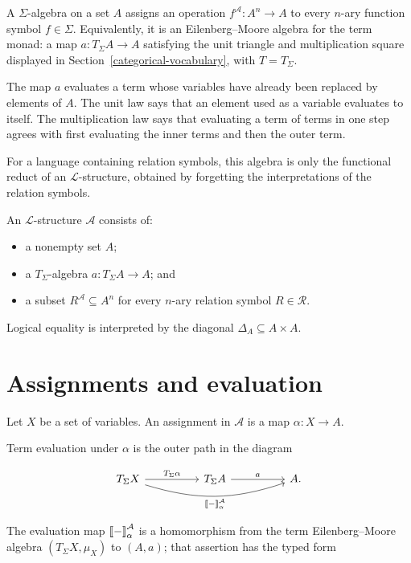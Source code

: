 \documentclass[11pt]{article}
\newcommand{\llbracket}{\mathopen{[\mkern-3mu[}}
\newcommand{\rrbracket}{\mathclose{]\mkern-3mu]}}
\newcommand{\tightlist}{\setlength{\itemsep}{0pt}%
  \setlength{\parskip}{0pt}}
\begin{document}
A \(\Sigma\)-algebra on a set \(A\) assigns an operation
\(f^{\mathcal A}:A^n\to A\) to every \(n\)-ary function symbol
\(f\in\Sigma\). Equivalently, it is an Eilenberg--Moore algebra for the
term monad: a map \(a:T_\Sigma A\to A\) satisfying the unit triangle and
multiplication square displayed in Section~\ref{categorical-vocabulary}, with
\(T=T_\Sigma\).

The map \(a\) evaluates a term whose variables have already been
replaced by elements of \(A\). The unit law says that an element used as
a variable evaluates to itself. The multiplication law says that
evaluating a term of terms in one step agrees with first evaluating the
inner terms and then the outer term.

For a language containing relation symbols, this algebra is only the
functional reduct of an \(\mathcal L\)-structure, obtained by forgetting
the interpretations of the relation symbols.

An
\(\mathcal L\)-structure \(\mathcal A\) consists of:

\begin{itemize}
\tightlist
\item
  a nonempty set \(A\);
\item
  a \(T_\Sigma\)-algebra \(a:T_\Sigma A\to A\); and
\item
  a subset \(R^{\mathcal A}\subseteq A^n\) for every \(n\)-ary relation
  symbol \(R\in\mathcal R\).
\end{itemize}

Logical equality is interpreted by the diagonal
\(\Delta_A\subseteq A\times A\).

\section{Assignments and
evaluation}\label{assignments-and-evaluation}

Let \(X\) be a set of variables. An assignment in \(\mathcal A\) is a map
\(\alpha:X\to A\).

Term evaluation under \(\alpha\) is the outer path in the diagram

\[
\begin{tikzcd}[column sep=huge]
T_\Sigma X \arrow[r,"T_\Sigma\alpha"]
  \arrow[rr,bend right=18,"\llbracket-\rrbracket^{\mathcal A}_\alpha"'] &
T_\Sigma A \arrow[r,"a"] & A.
\end{tikzcd}
\]

The evaluation map \(\llbracket-\rrbracket^{\mathcal A}_\alpha\) is a
homomorphism from the term Eilenberg--Moore algebra
\((T_\Sigma X,\mu_X)\) to \((A,a)\); that assertion has the typed form
\end{document}
